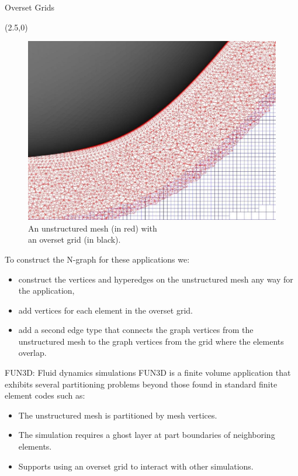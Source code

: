 \documentclass{beamer}
\begin{document}
\begin{textblock}{15.6}
\begin{textblock}{5}
\begin{block}{\centering Overset Grids}
\begin{textblock}{2.7}
        

      \end{textblock}
      \begin{textblock}{2.5}(2.5,0)
        \begin{figure}
          \centering
          \includegraphics[height=.6\textwidth]{../figures/overset_grid.jpg}
          \caption{An unstructured mesh (in red) with \\an overset grid (in black).}
        \end{figure}
      \end{textblock}
      \vspace{14cm}

      
      To construct the N-graph for these applications we:
      \begin{itemize}
      \item construct the vertices and hyperedges on the unstructured mesh any way for the application,
      \item add vertices for each element in the overset grid.
      \item add a second edge type that connects the graph vertices from the unstructured mesh to the graph vertices from the grid where the elements overlap.
      \end{itemize}

      
    \end{block}
    
    \begin{block}{\centering FUN3D: Fluid dynamics simulations}
      FUN3D is a finite volume application that exhibits several partitioning problems beyond those found in standard finite element codes such as:
      \begin{itemize}
      \item The unstructured mesh is partitioned by mesh vertices.
      \item The simulation requires a ghost layer at part boundaries of neighboring elements.
      \item Supports using an overset grid to interact with other simulations.
      \end{itemize}


\end{block}
\end{textblock}
\end{textblock}
\end{document}
